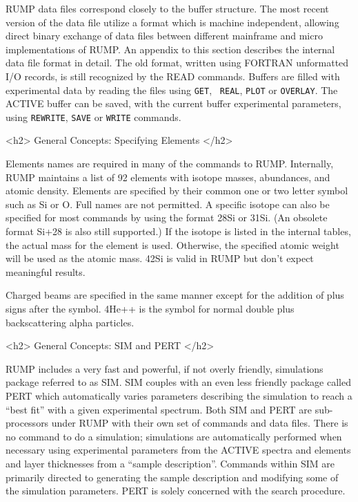 RUMP data files correspond closely to the buffer structure.  The most recent
version of the data file utilize a format which is machine independent,
allowing direct binary exchange of data files between different mainframe and
micro implementations of RUMP.  An appendix to this section describes the
internal data file format in detail.  The old format, written using FORTRAN
unformatted I/O records, is still recognized by the READ commands.  Buffers
are filled with experimental data by reading the files using {\tt GET}, {\tt
REAL}, {\tt PLOT} or {\tt OVERLAY}.  The ACTIVE buffer can be saved, with the
current buffer experimental parameters, using {\tt REWRITE}, {\tt SAVE} or
{\tt WRITE} commands.


<h2> General Concepts: Specifying Elements </h2>

Elements names are required in many of the commands to RUMP.  Internally,
RUMP maintains a list of 92 elements with isotope masses, abundances, and
atomic density.  Elements are specified by their common one or two letter
symbol such as Si or O.  Full names are not permitted.  A specific isotope
can also be specified for most commands by using the format 28Si or 31Si.  (An
obsolete format Si+28 is also still supported.)  If the isotope is listed in
the internal tables, the actual mass for the element is used.  Otherwise, the
specified atomic weight will be used as the atomic mass.  42Si is valid in
RUMP but don't expect meaningful results.

Charged beams are specified in the same manner except for the addition of
plus signs after the symbol.  4He++ is the symbol for normal double plus
backscattering alpha particles.


<h2> General Concepts: SIM and PERT </h2>

RUMP includes a very fast and powerful, if not overly friendly, simulations
package referred to as SIM.  SIM couples with an even less friendly package
called PERT which automatically varies parameters describing the simulation to
reach a ``best fit'' with a given experimental spectrum.  Both SIM and PERT
are sub-processors under RUMP with their own set of commands and data files.
There is no command to do a simulation; simulations are automatically
performed when necessary using experimental parameters from the ACTIVE spectra
and elements and layer thicknesses from a ``sample description''.  Commands
within SIM are primarily directed to generating the sample description and
modifying some of the simulation parameters.  PERT is solely concerned with
the search procedure.


